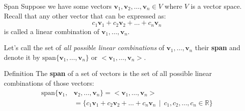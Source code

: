 \documentclass{beamer}
\newcommand{\vv}{\mathbf{v}}
\newcommand{\R}{\mathbb{R}}
\newcommand{\Span}{\text{span}}
\begin{document}


  
     
  


\begin{frame}{Span}
  Suppose we have some vectors $\vv_1, \vv_2,\dots,\vv_n\in V$ where $V$ is a vector space. Recall that any other vector that can be expressed as:
  \[c_1 \vv_1 + c_2 \vv_2 + \dots + c_n\vv_n\]
  is called a linear combination of $\vv_1,\dots,\vv_n$. \pause

  Let's call the set of \textit{all possible linear combinations} of $\vv_1,\dots,\vv_n$ their \textbf{span} and denote it by $\Span\{\vv_1,\dots,\vv_n\}$ or $<\vv_1, \ldots, \vv_n>$. \pause

 \begin{block}{Definition}
    The \textbf{span} of a set of vectors is the set of all possible linear combinations of those vectors:
     \begin{align*}
          \text{span}\{\vv_1, &\vv_2, \ldots, \vv_n\} = <\vv_1, \ldots, \vv_n> \\&=    \{c_1\vv_1 + c_2\vv_2 + \ldots + c_n\vv_n \,\mid\, c_1, c_2, \ldots, c_n \in \mathbb{R}\}
     \end{align*}
  \end{block}
  
 
\end{frame}
\end{document}
